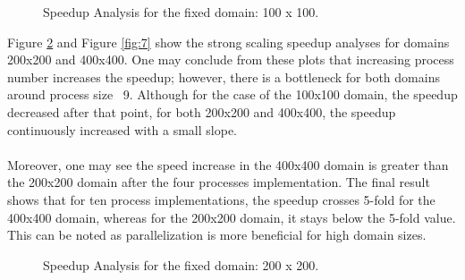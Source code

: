 \documentclass[12pt]{article}
\begin{document}
\begin{figure}[H]
\centering
{}
\caption{Speedup Analysis for the fixed domain: 100 x 100.}
\label{fig:5}
\end{figure}
\newpage

\noindent
Figure \ref{fig:6} and Figure \ref{fig:7} show the strong scaling speedup analyses for domains 200x200 and 400x400. One may conclude from these plots that increasing process number increases the speedup; however, there is a bottleneck for both domains around process size ~9. Although for the case of the 100x100 domain, the speedup decreased after that point, for both 200x200 and 400x400, the speedup continuously increased with a small slope. 
\\\\\noindent
Moreover, one may see the speed increase in the 400x400 domain is greater than the 200x200 domain after the four processes implementation. The final result shows that for ten process implementations, the speedup crosses 5-fold for the 400x400 domain, whereas for the 200x200 domain, it stays below the 5-fold value. This can be noted as parallelization is more beneficial for high domain sizes.

\begin{figure}[H]
\centering
{}
\caption{Speedup Analysis for the fixed domain: 200 x 200.}
\label{fig:6}
\end{figure}
\end{document}

